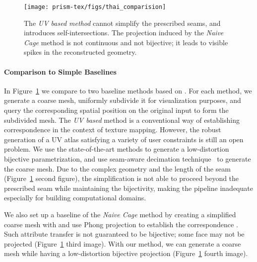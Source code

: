 \begin{figure}
    \centering
    \texttt{[image: prism-tex/figs/thai\_comparision]}
    \caption{The \emph{UV based method} cannot simplify the prescribed seams, and introduces self-intersections. 
    The projection induced by the \emph{Naive Cage} method is not continuous and not bijective; it leads to visible spikes in the reconstructed geometry.}
    \label{prism:fig:qslim_naive}
    
\end{figure}

\paragraph{Comparison to Simple Baselines}
In Figure~\ref{prism:fig:qslim_naive} we compare to two baseline methods based on \cite{garland1998simplifying}. For each method, we generate a coarse mesh, uniformly subdivide it for visualization purposes, 
and query the corresponding spatial position on the original input to form the subdivided mesh.
The \emph{UV based} method is a conventional way of establishing correspondence in the context of texture mapping. However, the robust generation of a UV atlas satisfying a variety of user constraints is still an open problem. We use the state-of-the-art methods \cite{li2018optcuts,jiang2017simplicial} to generate a low-distortion bijective parametrization, and use seam-aware decimation technique~\cite{liu2017seamless} to generate the coarse mesh.
Due to the complex geometry and the length of the seam (Figure~\ref{prism:fig:qslim_naive} second figure), the simplification is not able to proceed beyond the prescribed seam while maintaining the bijectivity, making the pipeline inadequate especially for building computational domains. 

{We also set up a baseline of the \emph{Naive Cage} method by creating} a simplified coarse mesh with \cite{garland1998simplifying} and use Phong projection to establish the correspondence \cite{kobbelt1998interactive,panozzo2013weighted}. {Such attribute transfer} is not guaranteed to be bijective; some face may not be projected (Figure~\ref{prism:fig:qslim_naive} third image). With our method, we can generate a coarse mesh while having a low-distortion bijective projection (Figure~\ref{prism:fig:qslim_naive} fourth image).

